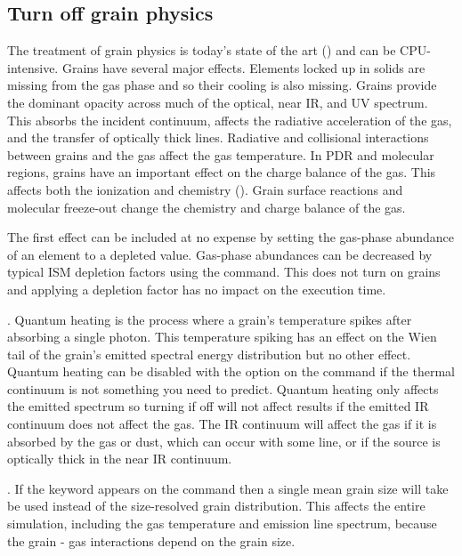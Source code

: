 \subsection{Turn off grain physics}

The treatment of grain physics is today's state of the art
(\citealp{VanHoof2004}) and can be CPU-intensive.
Grains have several major effects.
Elements locked up in solids are missing from the gas phase and so their
cooling is also missing.
Grains provide the dominant opacity across much
of the optical, near IR, and UV spectrum.
This absorbs the incident
continuum, affects the radiative acceleration of the gas, and the transfer
of optically thick lines.
Radiative and collisional interactions between
grains and the gas affect the gas temperature.
In PDR and molecular regions,
grains have an important effect on the charge balance of the gas.
This
affects both the ionization and chemistry (\citealp{Abel2005}).
Grain surface
reactions and molecular freeze-out change the chemistry and charge balance
of the gas.

The first effect can be included at no expense by setting the gas-phase
abundance of an element to a depleted value.
Gas-phase abundances can be
decreased by typical ISM depletion factors using the
 command.
This does not turn on grains and applying a depletion
factor has no impact on the execution time.

.  Quantum heating
is the process where a grain's
temperature spikes after absorbing a single photon.
This temperature spiking
has an effect on the Wien tail of the grain's emitted spectral energy
distribution but no other effect.
Quantum heating can be disabled with
the  option on the  command if the thermal continuum is not
something you need to predict.
Quantum heating only affects the emitted
spectrum so turning if off will not affect results if the emitted IR
continuum does not affect the gas.
The IR continuum will affect the gas
if it is absorbed by the gas or dust, which can occur with some line, or
if the source is optically thick in the near IR continuum.

.
If the  keyword appears
on the  command then a single mean grain size
will take be used instead
of the size-resolved grain distribution.
This affects the entire simulation,
including the gas temperature and emission line spectrum,
because the grain
- gas interactions depend on the grain size.

